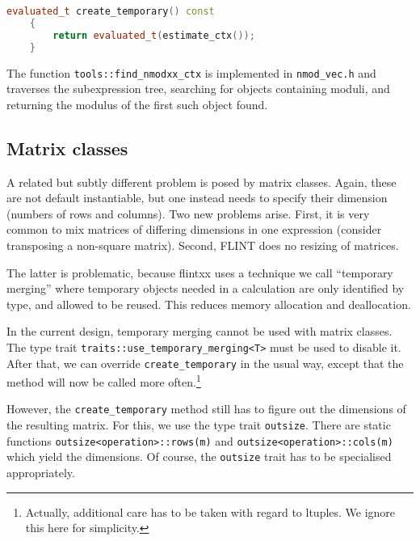 \documentclass[a4paper,10pt]{book}
\newcommand{\code}{\lstinline}
\begin{document}
{{\begin{lstlisting}[language=c++]
    evaluated_t create_temporary() const
    {
        return evaluated_t(estimate_ctx());
    }
\end{lstlisting}

The function \code{tools::find_nmodxx_ctx} is implemented in \code{nmod_vec.h}
and traverses the subexpression tree, searching for objects containing moduli,
and returning the modulus of the first such object found.


\subsection{Matrix classes}

A related but subtly different problem is posed by matrix classes. Again, these
are not default instantiable, but one instead needs to specify their dimension
(numbers of rows and columns). Two new problems arise. First, it is very common
to mix matrices of differing dimensions in one expression (consider transposing
a non-square matrix). Second, FLINT does no resizing of matrices.

The latter is problematic, because flintxx uses a technique we call ``temporary
merging'' where temporary objects needed in a calculation are only identified by
type, and allowed to be reused. This reduces memory allocation and deallocation.

In the current design, temporary merging cannot be used with matrix classes. The
type trait \code{traits::use_temporary_merging<T>} must be used to disable it.
After that, we can override \code{create_temporary} in the usual way, except
that the method will now be called more often.\footnote{Actually, additional care
has to be taken with regard to ltuples. We ignore this here for simplicity.}

However, the \code{create_temporary} method still has to figure out the
dimensions of the resulting matrix. For this, we use the type trait
\code{outsize}. There are static functions \code{outsize<operation>::rows(m)}
and \code{outsize<operation>::cols(m)} which yield the dimensions. Of course,
the \code{outsize} trait has to be specialised appropriately.

}}
\end{document}
